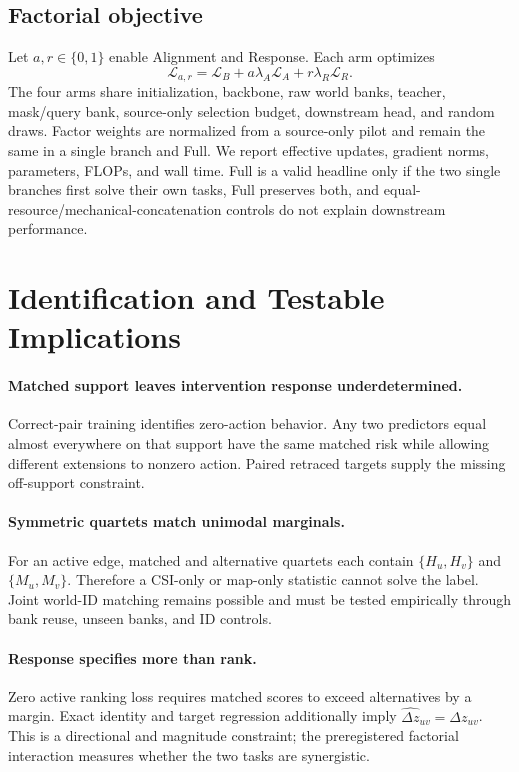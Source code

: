 \documentclass{article}
\newcommand{\csi}{H}
\newcommand{\map}{M}
\begin{document}
\subsection{Factorial objective}

Let $a,r\in\{0,1\}$ enable Alignment and Response.  Each arm optimizes
\begin{equation}
 \mathcal L_{a,r}=\mathcal L_B+a\lambda_A\mathcal L_A
 +r\lambda_R\mathcal L_R.
\end{equation}
The four arms share initialization, backbone, raw world banks, teacher,
mask/query bank, source-only selection budget, downstream head, and random
draws.  Factor weights are normalized from a source-only pilot and remain the
same in a single branch and Full.  We report effective updates, gradient norms,
parameters, FLOPs, and wall time.  Full is a valid headline only if the two
single branches first solve their own tasks, Full preserves both, and
equal-resource/mechanical-concatenation controls do not explain downstream
performance.

\section{Identification and Testable Implications}

\paragraph{Matched support leaves intervention response underdetermined.}
Correct-pair training identifies zero-action behavior.  Any two predictors equal
almost everywhere on that support have the same matched risk while allowing
different extensions to nonzero action.  Paired retraced targets supply the
missing off-support constraint.

\paragraph{Symmetric quartets match unimodal marginals.}
For an active edge, matched and alternative quartets each contain
$\{\csi_u,\csi_v\}$ and $\{\map_u,\map_v\}$.  Therefore a CSI-only or map-only
statistic cannot solve the label.  Joint world-ID matching remains possible and
must be tested empirically through bank reuse, unseen banks, and ID controls.

\paragraph{Response specifies more than rank.}
Zero active ranking loss requires matched scores to exceed alternatives by a
margin.  Exact identity and target regression additionally imply
$\widehat{\Delta z}_{uv}=\Delta z_{uv}$.  This is a directional and magnitude
constraint; the preregistered factorial interaction measures whether the two
tasks are synergistic.
\end{document}

